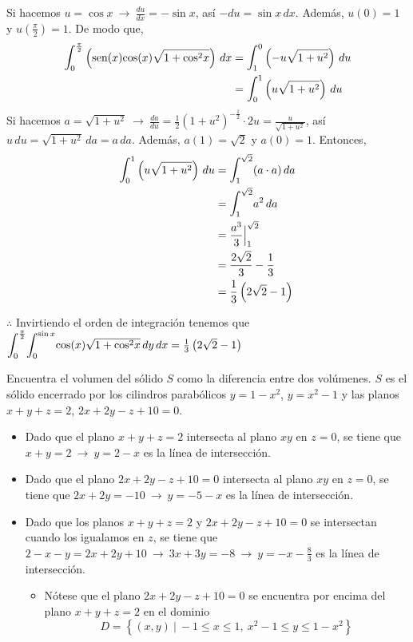 \documentclass[12pt]{exam}
\begin{document}
\begin{questions}
\begin{enumerate}[a)]
    Si hacemos $u=\cos{x} ~\rightarrow~ \frac{du}{dx}=-\sin{x}$, así $-du=\sin{x\,dx}$. Además, $u(0)=1$ y $u(\frac{\pi}{2})=1$. De modo que,
    \begin{align*}
      \mathlarger{\int}_0^{\frac{\pi}{2}}\left( \text{sen}(x)\text{cos}(x)\sqrt{1+\text{cos}^2x}\right)\,dx
      &= 
      \mathlarger{\int}_1^0\left( -u\sqrt{1+u^2}\right)\,du \\
      &= \mathlarger{\int}_0^1\left( u\sqrt{1+u^2}\right)\,du \\
    \end{align*}
    Si hacemos $a=\sqrt{1+u^2}~\rightarrow ~ \frac{da}{du}=\frac{1}{2}(1+u^2)^{-\frac{1}{2}}\cdot 2u= \frac{u}{\sqrt{1+u^2}}$, así $u\,du = \sqrt{1+u^2}\, da=a\,da$. Además, $a(1)=\sqrt{2}$ y $a(0)=1$. Entonces, 
    \begin{align*}
      \mathlarger{\int}_0^1\left( u\sqrt{1+u^2}\right)\,du
      &= \mathlarger{\int}_1^{\sqrt{2}} (a\cdot a)\,da\\
      &= \mathlarger{\int}_1^{\sqrt{2}} a^2\,da\\
      &= \frac{a^3}{3}\Big|_1^{\sqrt{2}}\\
      &= \frac{2\sqrt{2}}{3}- \frac{1}{3}\\
      &= \frac{1}{3}\left(2\sqrt{2}-1\right)
    \end{align*}

    $\therefore$  Invirtiendo el orden de integración tenemos que $\mathlarger{\int}_0^{\frac{\pi}{2}}\mathlarger{\int}_0^{\sin{x}} \text{cos}(x)\sqrt{1+\text{cos}^2x}\, dy\,dx = \frac{1}{3}\left(2\sqrt{2}-1\right)$
  \end{enumerate}

  \question
  Encuentra el volumen del sólido $S$ como la diferencia entre dos volúmenes. $S$ es el sólido encerrado por los cilindros parabólicos $y=1-x^2$, $y=x^2-1$ y las planos $x+y+z=2$, $2x+2y-z+10=0$.

  \begin{itemize}
  \item Dado que el plano $x+y+z=2$ intersecta al plano $xy$ en $z=0$, se tiene que $x+y=2~\rightarrow ~y=2-x$ es la línea de intersección.
  \item Dado que el plano $2x+2y-z+10=0$ intersecta al plano $xy$ en $z=0$, se tiene que $2x+2y=-10~\rightarrow ~y=-5-x$ es la línea de intersección.
  \item Dado que los planos $x+y+z=2$ y $2x+2y-z+10=0$ se intersectan cuando los igualamos en $z$, se tiene que $2-x-y=2x+2y+10~\rightarrow ~ 3x+3y=-8 ~ \rightarrow ~ y = -x-\frac{8}{3}$ es la línea de intersección.
    \begin{itemize}
    \item Nótese que el plano $2x+2y-z+10=0$ se encuentra por encima del plano $x+y+z=2$ en el dominio
      $$D=\left\{(x,y)~|~-1\leq x\leq 1, ~ x^2-1\leq y \leq 1-x^2\right\}$$
    \end{itemize}
  \end{itemize}


\end{questions}
\end{document}
